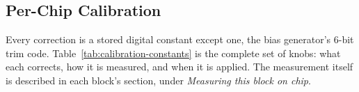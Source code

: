 %
%

\subsection{Per-Chip Calibration}\label{ss:calibration}

Every correction is a stored digital constant except one, the bias generator's
6-bit trim code. Table~\ref{tab:calibration-constants} is the complete set of
knobs: what each corrects, how it is measured, and when it is applied. The
measurement itself is described in each block's section, under \emph{Measuring
this block on chip}.

